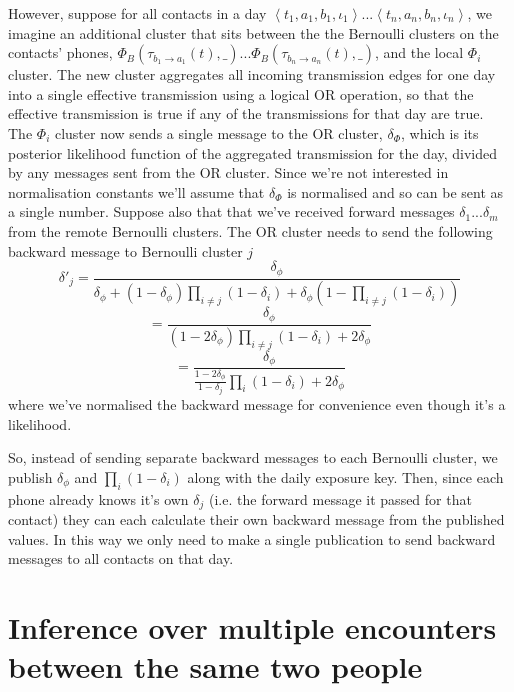 \documentclass{article}
\begin{document}
However, suppose for all contacts in a day $\left<t_1,a_1,b_1,\iota_1\right>...\left<t_n,a_n,b_n,\iota_n\right>$, we imagine an additional cluster that sits between the the Bernoulli clusters on the contacts' phones, $ \Phi_B(\tau_{b_1\rightarrow a_1}(t),\_) ... \Phi_B(\tau_{b_n\rightarrow a_n}(t),\_)$, and the local $\Phi_i$ cluster. The new cluster aggregates all incoming transmission edges for one day into a single effective transmission using a logical OR operation, so that the effective transmission is true if any of the transmissions for that day are true. The $\Phi_i$ cluster now sends a single message to the OR cluster, $\delta_\Phi$, which is its posterior likelihood function of the aggregated transmission for the day, divided by any messages sent from the OR cluster. Since we're not interested in normalisation constants we'll assume that $\delta_\Phi$ is normalised and so can be sent as a single number. Suppose also that that we've received forward messages $\delta_1...\delta_m$ from the remote Bernoulli clusters. The OR cluster needs to send the following backward message to Bernoulli cluster $j$
\[
\delta'_j = \frac{\delta_\phi}{\delta_\phi + (1-\delta_\phi)\prod_{i\ne j}(1-\delta_i) + \delta_\phi(1 - \prod_{i\ne j}(1-\delta_i))}
\]
\[
= \frac{\delta_\phi}{ (1-2\delta_\phi)\prod_{i\ne j}(1-\delta_i) + 2\delta_\phi}
\]
\[
= \frac{\delta_\phi}{ \frac{1-2\delta_\phi}{1-\delta_j}\prod_{i}(1-\delta_i) + 2\delta_\phi}
\]
where we've normalised the backward message for convenience even though it's a likelihood.

So, instead of sending separate backward messages to each Bernoulli cluster, we publish $\delta_\phi$ and $\prod_i (1-\delta_i)$ along with the daily exposure key. Then, since each phone already knows it's own $\delta_j$ (i.e. the forward message it passed for that contact) they can each calculate their own backward message from the published values. In this way we only need to make a single publication to send backward messages to all contacts on that day.

\section{Inference over multiple encounters between the same two people}
\end{document}
